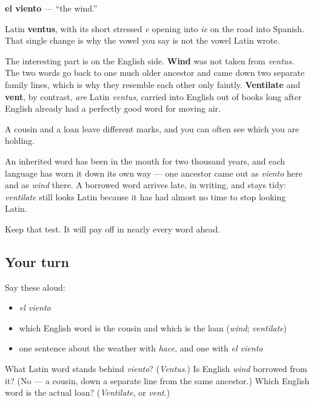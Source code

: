 \begin{cousinweb}
\textbf{el viento} — \textquotedblleft{}the wind.\textquotedblright{}

Latin \textbf{ventus}, with its short stressed \emph{e} opening into \emph{ie} on the road into Spanish. That single change is why the vowel you say is not the vowel Latin wrote.

The interesting part is on the English side. \textbf{Wind} was not taken from \emph{ventus}. The two words go back to one much older ancestor and came down two separate family lines, which is why they resemble each other only faintly. \textbf{Ventilate} and \textbf{vent}, by contrast, \emph{are} Latin \emph{ventus}, carried into English out of books long after English already had a perfectly good word for moving air.
\end{cousinweb}

\begin{grammarlens}[title={What you've built}]
A cousin and a loan leave different marks, and you can often see which you are holding.

An inherited word has been in the mouth for two thousand years, and each language has worn it down its own way — one ancestor came out as \emph{viento} here and as \emph{wind} there. A borrowed word arrives late, in writing, and stays tidy: \emph{ventilate} still looks Latin because it has had almost no time to stop looking Latin.

Keep that test. It will pay off in nearly every word ahead.
\end{grammarlens}

\subsection*{Your turn}
Say these aloud:

\begin{itemize}
\raggedright
  \item \emph{el viento}
  \item which English word is the cousin and which is the loan (\emph{wind}; \emph{ventilate})
  \item one sentence about the weather with \emph{hace}, and one with \emph{el viento}
\end{itemize}

\begin{tcolorbox}[breakable,colback=teal!4,colframe=teal!35!black,title={Before you move on}]
What Latin word stands behind \emph{viento}? (\emph{Ventus}.) Is English \emph{wind} borrowed from it? (No — a cousin, down a separate line from the same ancestor.) Which English word is the actual loan? (\emph{Ventilate}, or \emph{vent}.)
\end{tcolorbox}
